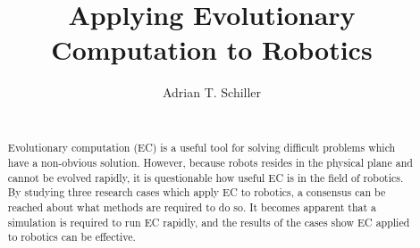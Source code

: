 \documentclass{sig-alternate}
\begin{document}
%

\title{
Applying Evolutionary Computation to Robotics}
%
%
%
%
%

%
\author{
%
%
\alignauthor
Adrian T. Schiller \\
 \\
}

\maketitle
\begin{abstract}
  Evolutionary computation (EC) is a useful tool for solving difficult problems which have a non-obvious solution. However, because robots resides in the physical plane and cannot be evolved rapidly, it is questionable how useful EC is in the field of robotics. By studying three research cases which apply EC to robotics, a consensus can be reached about what methods are required to do so. It becomes apparent that a simulation is required to run EC rapidly, and the results of the cases show EC applied to robotics can be effective. 
\end{abstract}
\end{document}
